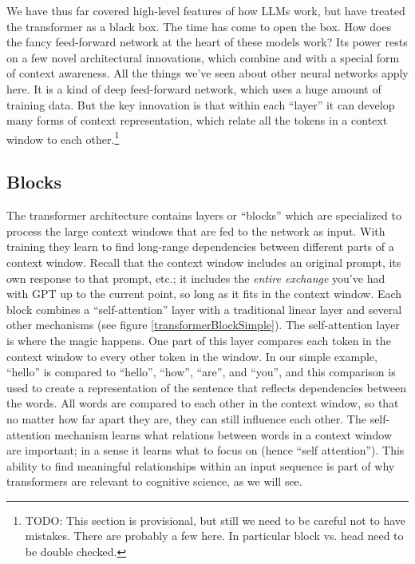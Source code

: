 We have thus far covered high-level features of how LLMs work, but have treated the transformer as a black box.  The time has come to open the box. How does the fancy feed-forward network at the heart of these models work? Its power rests on a few novel architectural innovations, which combine  and  with a special form of context awareness. All the things we've seen about other neural networks apply here. It is a kind of deep feed-forward network, which uses a huge amount of training data. But the key innovation is that within each ``layer'' it can develop many forms of context representation, which relate all the tokens in a context window to each other.\footnote{TODO: This section is provisional, but still we need to be careful not to have mistakes. There are probably a few here. In particular block vs. head need to be double checked.}

\subsection{Blocks}

The transformer architecture \cite{vaswani2017attention} contains layers or ``blocks'' which are specialized to process the large context windows that are fed to the network as input. With training they learn to find long-range dependencies between different parts of a context window. Recall that the context window  includes an original prompt, its own response to that prompt, etc.; it includes the \emph{entire exchange} you've had with GPT up to the current point, so long as it fits in the context window. Each block combines  a ``self-attention'' layer with a traditional linear layer and several other mechanisms (see figure \ref{transformerBlockSimple}). The self-attention layer is where the magic happens. One part of this layer compares each token in the context window to every other token in the window. In our simple example, ``hello'' is compared to ``hello'', ``how'', ``are'', and ``you'', and this comparison is used to create a representation of the sentence that reflects dependencies between the words. All words are compared to each other in the context window, so that no matter how far apart they are, they can still influence each other. The self-attention mechanism learns what relations between words in a context window are important; in a sense it learns what to focus on (hence ``self attention''). This ability to find meaningful relationships within an input sequence is part of why transformers are relevant to cognitive science, as we will see.

